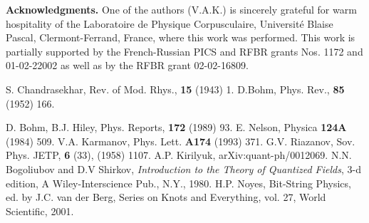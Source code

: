 \documentclass[a4paper,12pt]{article}
\begin{document}
{\bf Acknowledgments.}\; One of the authors (V.A.K.) is sincerely
grateful for warm hospitality of the Laboratoire de Physique
Corpusculaire, Universit\'e Blaise Pascal, Clermont-Ferrand,
France, where this work was performed. This work is partially
supported by the French-Russian PICS and RFBR grants Nos. 1172 and
01-02-22002 as well as by the RFBR grant 02-02-16809.




\begin{thebibliography}{10}
S. Chandrasekhar, Rev. of Mod. Rhys., {\bf 15} (1943) 1.
D.Bohm, Phys. Rev., {\bf 85}  (1952) 166.

D. Bohm, B.J. Hiley, Phys. Reports, {\bf 172} (1989) 93.
E. Nelson, Physica {\bf 124A} (1984) 509.
V.A. Karmanov, Phys. Lett. {\bf A174} (1993) 371.
G.V. Riazanov, Sov. Phys. JETP, {\bf 6} (33), (1958) 1107.
A.P. Kirilyuk, arXiv:quant-ph/0012069.
N.N. Bogoliubov and D.V Shirkov, {\it Introduction to the Theory of
Quantized Fields},
3-d edition, A Wiley-Interscience Pub., N.Y., 1980.
H.P. Noyes, Bit-String Physics, ed. by J.C. van der
Berg, Series
on Knots and Everything, vol. 27, World Scientific, 2001.
\end{thebibliography}
\end{document}
